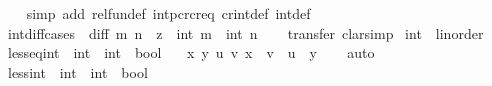 \begin{isabellebody}
%
\isadelimproof
\ \ %
\endisadelimproof
%
\isatagproof
{}\isamarkupfalse%
\ {\isacharparenleft}{\kern0pt}simp\ add{\isacharcolon}{\kern0pt}\ rel{\isacharunderscore}{\kern0pt}fun{\isacharunderscore}{\kern0pt}def\ int{\isachardot}{\kern0pt}pcr{\isacharunderscore}{\kern0pt}cr{\isacharunderscore}{\kern0pt}eq\ cr{\isacharunderscore}{\kern0pt}int{\isacharunderscore}{\kern0pt}def\ int{\isacharunderscore}{\kern0pt}def{\isacharparenright}{\kern0pt}%
\endisatagproof
{\isafoldproof}%
%
\isadelimproof
\isanewline
%
\endisadelimproof
\isanewline
{}\isamarkupfalse%
\ int{\isacharunderscore}{\kern0pt}diff{\isacharunderscore}{\kern0pt}cases{\isacharcolon}{\kern0pt}\ \ {\isacharparenleft}{\kern0pt}diff{\isacharparenright}{\kern0pt}\ m\ n\ \ {\isachardoublequoteopen}z\ {\isacharequal}{\kern0pt}\ int\ m\ {\isacharminus}{\kern0pt}\ int\ n{\isachardoublequoteclose}\isanewline
%
\isadelimproof
\ \ %
\endisadelimproof
%
\isatagproof
{}\isamarkupfalse%
\ transfer\ clarsimp%
\endisatagproof
{\isafoldproof}%
%
\isadelimproof
%
\endisadelimproof
%
\isadelimdocument
%
\endisadelimdocument
%
\isatagdocument
%
\isamarkuptrue%
%
\endisatagdocument
{\isafolddocument}%
%
\isadelimdocument
%
\endisadelimdocument
{}\isamarkupfalse%
\ int\ {\isacharcolon}{\kern0pt}{\isacharcolon}{\kern0pt}\ linorder\isanewline
{}\isanewline
\isanewline
{}\isamarkupfalse%
\ less{\isacharunderscore}{\kern0pt}eq{\isacharunderscore}{\kern0pt}int\ {\isacharcolon}{\kern0pt}{\isacharcolon}{\kern0pt}\ {\isachardoublequoteopen}int\ {\isasymRightarrow}\ int\ {\isasymRightarrow}\ bool{\isachardoublequoteclose}\isanewline
\ \ \ {\isachardoublequoteopen}{\isasymlambda}{\isacharparenleft}{\kern0pt}x{\isacharcomma}{\kern0pt}\ y{\isacharparenright}{\kern0pt}\ {\isacharparenleft}{\kern0pt}u{\isacharcomma}{\kern0pt}\ v{\isacharparenright}{\kern0pt}{\isachardot}{\kern0pt}\ x\ {\isacharplus}{\kern0pt}\ v\ {\isasymle}\ u\ {\isacharplus}{\kern0pt}\ y{\isachardoublequoteclose}\isanewline
%
\isadelimproof
\ \ %
\endisadelimproof
%
\isatagproof
{}\isamarkupfalse%
\ auto%
\endisatagproof
{\isafoldproof}%
%
\isadelimproof
\isanewline
%
\endisadelimproof
\isanewline
{}\isamarkupfalse%
\ less{\isacharunderscore}{\kern0pt}int\ {\isacharcolon}{\kern0pt}{\isacharcolon}{\kern0pt}\ {\isachardoublequoteopen}int\ {\isasymRightarrow}\ int\ {\isasymRightarrow}\ bool{\isachardoublequoteclose}\isanewline

\end{isabellebody}
